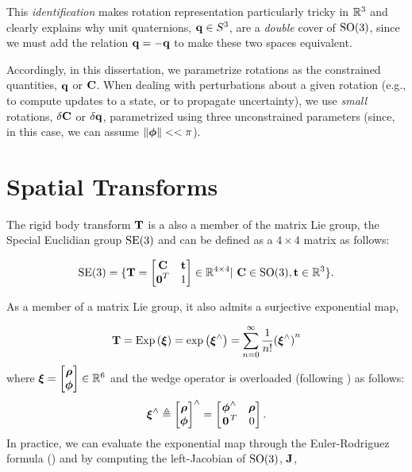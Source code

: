This \textit{identification} makes rotation representation particularly tricky in $\RealNumbers{}^3$ and clearly explains why unit quaternions, $\boldsymbol{\mathbf{q}} \in S^3$, are a \textit{double} cover of  $\mathrm{SO}(3)$, since we must add the relation $\boldsymbol{\mathbf{q}} = -\boldsymbol{\mathbf{q}}$ to make these two spaces equivalent.

Accordingly, in this dissertation, we parametrize rotations as the constrained quantities, $\boldsymbol{\mathbf{q}}$ or $\boldsymbol{\mathbf{C}}$. When dealing with perturbations about a given rotation (e.g., to compute updates to a state, or to propagate uncertainty), we use \textit{small} rotations, $\delta \boldsymbol{\mathbf{C}}$ or $\delta \boldsymbol{\mathbf{q}}$, parametrized using three unconstrained parameters (since, in this case, we can assume $\left\Vert\boldsymbol{\mathbf{\phi}}\right\Vert << \pi$).

\section{Spatial Transforms}
The rigid body transform $\boldsymbol{\mathbf{T}}$ is a also a member of the matrix Lie group, the Special Euclidian group $\mathrm{SE}(3)$ and can be defined as a $4 \times 4$ matrix as follows:

\begin{equation}
\mathrm{SE}(3) = \{ \boldsymbol{\mathbf{T}} = \begin{bmatrix} \boldsymbol{\mathbf{C}} & \boldsymbol{\mathbf{t}} \\ \boldsymbol{\mathbf{0}}^T & 1 \end{bmatrix} \in \mathbb{R}{}^{4 \times 4} | ~  \boldsymbol{\mathbf{C}} \in \mathrm{SO}(3),  \boldsymbol{\mathbf{t}} \in \mathbb{R}{}^3  \}.
\end{equation}

As a member of a matrix Lie group, it also admits a surjective exponential map,

\begin{equation}
\boldsymbol{\mathbf{T}} = \mathrm{Exp}\left({\boldsymbol{\mathbf{\xi}}}\right) = \mathrm{exp}\left({\boldsymbol{\mathbf{\xi}}}^{\wedge}\right) = \sum_{n=0}^{\infty}  \frac{1}{n!} {(\boldsymbol{\mathbf{\xi}}^\wedge)}^n	
\end{equation}
where $\boldsymbol{\mathbf{\xi}} = \begin{bmatrix} \boldsymbol{\mathbf{\rho}} \\ \boldsymbol{\mathbf{\phi}} \end{bmatrix} \in \mathbb{R}{}^6$ and the wedge operator is overloaded (following \cite{Barfoot2017-ri}) as follows:
\begin{equation}
  \boldsymbol{\mathbf{\xi}}^\wedge \triangleq \begin{bmatrix} \boldsymbol{\mathbf{\rho}} \\ \boldsymbol{\mathbf{\phi}} \end{bmatrix} ^\wedge = \begin{bmatrix}
  \boldsymbol{\mathbf{\phi}}^\wedge & \boldsymbol{\mathbf{\rho}} \\ \left.{\boldsymbol{\mathbf{0}}}\right.^T &  0 \end{bmatrix}.	
\end{equation}
In practice, we can evaluate the exponential map through the Euler-Rodriguez formula () and by computing the left-Jacobian of $\mathrm{SO}(3)$,  $\boldsymbol{\mathbf{J}}$, 


